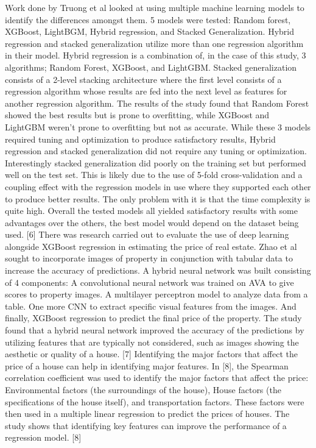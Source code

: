 \documentclass[conference]{IEEEtran}
\begin{document}
	Work done by Truong et al looked at using multiple machine learning models to identify the differences amongst them. 5 models were tested: Random forest, XGBoost, LightBGM, Hybrid regression, and Stacked Generalization. Hybrid regression and stacked generalization utilize more than one regression algorithm in their model. Hybrid regression is a combination of, in the case of this study, 3 algorithms; Random Forest, XGBoost, and LightGBM. Stacked generalization consists of a 2-level stacking architecture where the first level consists of a regression algorithm whose results are fed into the next level as features for another regression algorithm. The results of the study found that Random Forest showed the best results but is prone to overfitting, while XGBoost and LightGBM weren’t prone to overfitting but not as accurate. While these 3 models required tuning and optimization to produce satisfactory results, Hybrid regression and stacked generalization did not require any tuning or optimization. Interestingly stacked generalization did poorly on the training set but performed well on the test set. This is likely due to the use of 5-fold cross-validation and a coupling effect with the regression models in use where they supported each other to produce better results. The only problem with it is that the time complexity is quite high. Overall the tested models all yielded satisfactory results with some advantages over the others, the best model would depend on the dataset being used. [6]        
There was research carried out to evaluate the use of deep learning alongside XGBoost regression in estimating the price of real estate. Zhao et al sought to incorporate images of property in conjunction with tabular data to increase the accuracy of predictions. A hybrid neural network was built consisting of 4 components: A convolutional neural network was trained on AVA to give scores to property images. A multilayer perceptron model to analyze data from a table. One more CNN to extract specific visual features from the images. And finally, XGBoost regression to predict the final price of the property. The study found that a hybrid neural network improved the accuracy of the predictions by utilizing features that are typically not considered, such as images showing the aesthetic or quality of a house. [7]      
Identifying the major factors that affect the price of a house can help in identifying major features. In [8], the Spearman correlation coefficient was used to identify the major factors that affect the price: Environmental factors (the surroundings of the house), House factors (the specifications of the house itself), and transportation factors. These factors were then used in a multiple linear regression to predict the prices of houses. The study shows that identifying key features can improve the performance of a regression model. [8]
\end{document}
